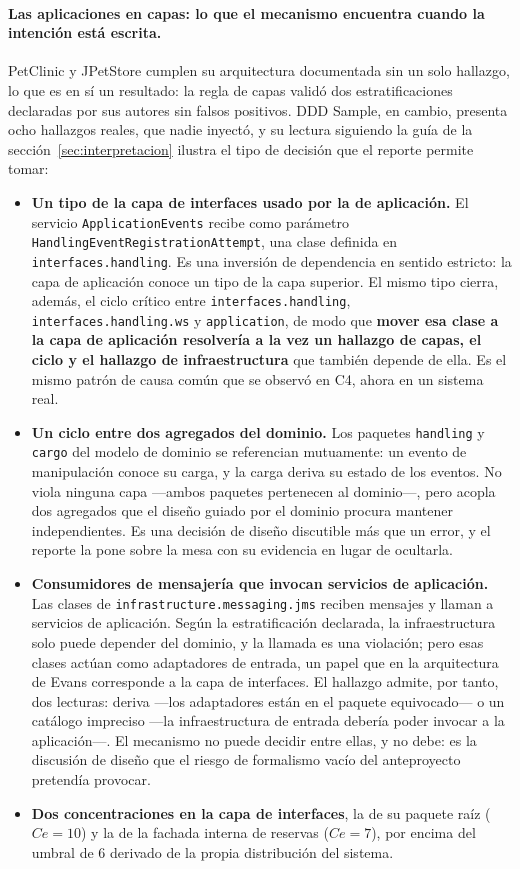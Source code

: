 \paragraph{Las aplicaciones en capas: lo que el mecanismo encuentra cuando la intención está escrita.} PetClinic y JPetStore cumplen su arquitectura documentada sin un solo hallazgo, lo que es en sí un resultado: la regla de capas validó dos estratificaciones declaradas por sus autores sin falsos positivos. DDD Sample, en cambio, presenta ocho hallazgos reales, que nadie inyectó, y su lectura siguiendo la guía de la sección~\ref{sec:interpretacion} ilustra el tipo de decisión que el reporte permite tomar:
\begin{itemize}
    \item \textbf{Un tipo de la capa de interfaces usado por la de aplicación.} El servicio \texttt{ApplicationEvents} recibe como parámetro \texttt{HandlingEventRegistrationAttempt}, una clase definida en \texttt{interfaces.handling}. Es una inversión de dependencia en sentido estricto: la capa de aplicación conoce un tipo de la capa superior. El mismo tipo cierra, además, el ciclo crítico entre \texttt{interfaces.handling}, \texttt{interfaces.handling.ws} y \texttt{application}, de modo que \textbf{mover esa clase a la capa de aplicación resolvería a la vez un hallazgo de capas, el ciclo y el hallazgo de infraestructura} que también depende de ella. Es el mismo patrón de causa común que se observó en C4, ahora en un sistema real.
    \item \textbf{Un ciclo entre dos agregados del dominio.} Los paquetes \texttt{handling} y \texttt{cargo} del modelo de dominio se referencian mutuamente: un evento de manipulación conoce su carga, y la carga deriva su estado de los eventos. No viola ninguna capa ---ambos paquetes pertenecen al dominio---, pero acopla dos agregados que el diseño guiado por el dominio procura mantener independientes. Es una decisión de diseño discutible más que un error, y el reporte la pone sobre la mesa con su evidencia en lugar de ocultarla.
    \item \textbf{Consumidores de mensajería que invocan servicios de aplicación.} Las clases de \texttt{infrastructure.messaging.jms} reciben mensajes y llaman a servicios de aplicación. Según la estratificación declarada, la infraestructura solo puede depender del dominio, y la llamada es una violación; pero esas clases actúan como adaptadores de entrada, un papel que en la arquitectura de Evans corresponde a la capa de interfaces. El hallazgo admite, por tanto, dos lecturas: deriva ---los adaptadores están en el paquete equivocado--- o un catálogo impreciso ---la infraestructura de entrada debería poder invocar a la aplicación---. El mecanismo no puede decidir entre ellas, y no debe: es la discusión de diseño que el riesgo de formalismo vacío del anteproyecto pretendía provocar.
    \item \textbf{Dos concentraciones en la capa de interfaces}, la de su paquete raíz ($Ce = 10$) y la de la fachada interna de reservas ($Ce = 7$), por encima del umbral de 6 derivado de la propia distribución del sistema.
\end{itemize}
